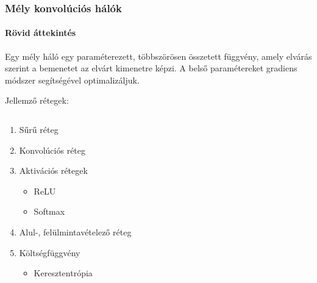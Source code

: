 \documentclass[11pt]{beamer}
\begin{document}
\begin{frame}
	\frametitle{Mély konvolúciós hálók}
	\framesubtitle{Rövid áttekintés}
	
	Egy mély háló egy paraméterezett, többszörösen összetett függvény, amely elvárás szerint a bemenetet az elvárt kimenetre képzi. A belső paramétereket gradiens módszer segítségével optimalizáljuk.
	
	Jellemző rétegek:

	\begin{columns}
		
		\begin{column}{.5\textwidth}
				\begin{enumerate}
				\item
				Sűrű réteg
				\item 
				Konvolúciós réteg
				\item 
				Aktivációs rétegek
				\begin{itemize}
					\item 
					ReLU
					\item
					Softmax
				\end{itemize}
				\item 
				Alul-, felülmintavételező réteg
				\item 
				Költségfüggvény\footnotemark 
				\begin{itemize}
					\item 
					Keresztentrópia
				\end{itemize}
			\end{enumerate}
		\end{column}
		\begin{column}{.5\textwidth}
			

\end{column}
\end{columns}
\end{frame}
\end{document}
